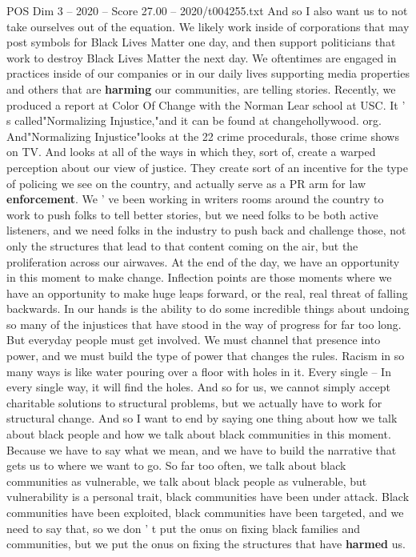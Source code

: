 \begin{textsample}{POS Dim 3 – 2020 – Score 27.00 – 2020/t004255.txt}
And so I also want us to not take ourselves out of the equation.
We likely work inside of corporations that may post symbols for Black Lives Matter one day, and then support politicians that work to destroy Black Lives Matter the next day.
We oftentimes are engaged in practices inside of our companies or in our daily lives supporting media properties and others that are \textbf{harming} our communities, are telling stories.
Recently, we produced a report at Color Of Change with the Norman Lear school at USC.
It ' s called"Normalizing Injustice,"and it can be found at changehollywood. org.
And"Normalizing Injustice"looks at the 22 crime procedurals, those crime shows on TV.
And looks at all of the ways in which they, sort of, create a warped perception about our view of justice.
They create sort of an incentive for the type of policing we see on the country, and actually serve as a PR arm for law \textbf{enforcement}.
We ' ve been working in writers rooms around the country to work to push folks to tell better stories, but we need folks to be both active listeners, and we need folks in the industry to push back and challenge those, not only the structures that lead to that content coming on the air, but the proliferation across our airwaves.
At the end of the day, we have an opportunity in this moment to make change.
Inflection points are those moments where we have an opportunity to make huge leaps forward, or the real, real threat of falling backwards.
In our hands is the ability to do some incredible things about undoing so many of the injustices that have stood in the way of progress for far too long.
But everyday people must get involved.
We must channel that presence into power, and we must build the type of power that changes the rules.
Racism in so many ways is like water pouring over a floor with holes in it.
Every single -- In every single way, it will find the holes.
And so for us, we cannot simply accept charitable solutions to structural problems, but we actually have to work for structural change.
And so I want to end by saying one thing about how we talk about black people and how we talk about black communities in this moment.
Because we have to say what we mean, and we have to build the narrative that gets us to where we want to go.
So far too often, we talk about black communities as vulnerable, we talk about black people as vulnerable, but vulnerability is a personal trait, black communities have been under attack.
Black communities have been exploited, black communities have been targeted, and we need to say that, so we don ' t put the onus on fixing black families and communities, but we put the onus on fixing the structures that have \textbf{harmed} us.

\end{textsample}
